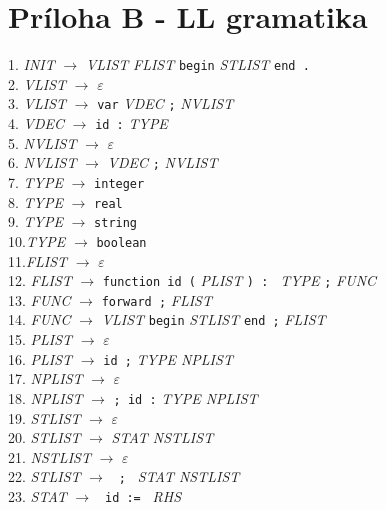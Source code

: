 \documentclass[a4paper, 11pt]{article}
\begin{document}
\section{Príloha B - LL gramatika}
1. \textit{INIT} $\rightarrow$ \textit{VLIST} \textit{FLIST} \texttt{begin} \textit{STLIST} \texttt{end .}\\
2. \textit{VLIST} $\rightarrow$ $\varepsilon$\\
3. \textit{VLIST} $\rightarrow$ \texttt{var} \textit{VDEC} \texttt{;} \textit{NVLIST}\\
4. \textit{VDEC} $\rightarrow$ \texttt{id :} \textit{TYPE}\\
5. \textit{NVLIST} $\rightarrow$ $\varepsilon$\\
6. \textit{NVLIST} $\rightarrow$ \textit{VDEC} \texttt{;} \textit{NVLIST}\\
7. \textit{TYPE} $\rightarrow$ \texttt{integer}\\
8. \textit{TYPE} $\rightarrow$ \texttt{real}\\
9. \textit{TYPE} $\rightarrow$ \texttt{string}\\
10.\textit{TYPE} $\rightarrow$ \texttt{boolean}\\
11.\textit{FLIST} $\rightarrow$ $\varepsilon$\\
12. \textit{FLIST} $\rightarrow$ \texttt{function id (} \textit{PLIST} \texttt{) : } \textit{TYPE} \texttt{;} \textit{FUNC}\\
13. \textit{FUNC} $\rightarrow$ \texttt{forward ;} \textit{FLIST}\\
14. \textit{FUNC} $\rightarrow$ \textit{VLIST} \texttt{begin} \textit{STLIST} \texttt{end ;} \textit{FLIST}\\
15. \textit{PLIST} $\rightarrow$ $\varepsilon$\\
16. \textit{PLIST} $\rightarrow$ \texttt{id ;} \textit{TYPE NPLIST}\\
17. \textit{NPLIST} $\rightarrow$ $\varepsilon$\\
18. \textit{NPLIST} $\rightarrow$ \texttt{; id :} \textit{TYPE NPLIST}\\
19. \textit{STLIST} $\rightarrow$ $\varepsilon$\\
20. \textit{STLIST} $\rightarrow$ \textit{STAT NSTLIST}\\
21. \textit{NSTLIST} $\rightarrow$ $\varepsilon$\\
22. \textit{STLIST} $\rightarrow$ \texttt{ ; } \textit{STAT NSTLIST}\\
23. \textit{STAT} $\rightarrow$ \texttt{ id := } \textit{RHS}\\
\end{document}
